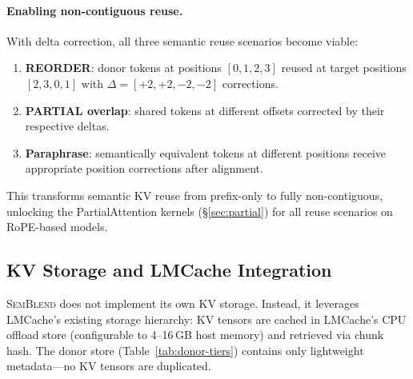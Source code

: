 \documentclass[10pt,twocolumn]{article}
\newcommand{\semblend}{\textsc{SemBlend}\xspace}
\begin{document}
\paragraph{Enabling non-contiguous reuse.}
With delta correction, all three semantic reuse scenarios become viable:
\begin{enumerate}[leftmargin=*,nosep]
\item \textbf{REORDER}: donor tokens at positions $[0,1,2,3]$ reused
  at target positions $[2,3,0,1]$ with $\Delta = [+2,+2,-2,-2]$
  corrections.
\item \textbf{PARTIAL overlap}: shared tokens at different offsets
  corrected by their respective deltas.
\item \textbf{Paraphrase}: semantically equivalent tokens at different
  positions receive appropriate position corrections after alignment.
\end{enumerate}
This transforms semantic KV reuse from prefix-only to fully
non-contiguous, unlocking the PartialAttention kernels
(\S\ref{sec:partial}) for all reuse scenarios on RoPE-based models.

\subsection{KV Storage and LMCache Integration}
\label{sec:tiers}

\semblend does not implement its own KV storage. Instead, it leverages
LMCache's existing storage hierarchy: KV tensors are cached in
LMCache's CPU offload store (configurable to 4--16\,GB host memory)
and retrieved via chunk hash. The donor store
(Table~\ref{tab:donor-tiers}) contains only lightweight metadata---no
KV tensors are duplicated.

\begin{table}[t]
\centering
\caption{Donor metadata store tiers (no KV tensor storage).}
\label{tab:donor-tiers}
\footnotesize
\setlength{\tabcolsep}{2.5pt}
\end{table}
\end{document}
